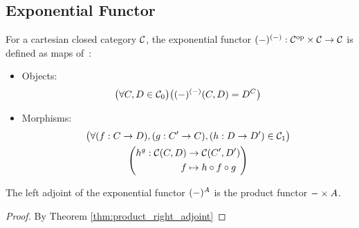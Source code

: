 \subsection{Exponential Functor}
\begin{definition}
  For a cartesian closed category $\mathcal{C}$, the exponential functor
  $({\--})^{({\--})}:\mathcal{C}^{\mathrm{op}}\times \mathcal{C} \to \mathcal{C}$ is defined as
  maps of~\parencite[p.~44]{lane:working_mathematician}:

  \begin{itemize}
    \item Objects:
      \[\big(\forall C, D \in \mathcal{C}_0\big)
        \big(({\--})^{({\--})}(C, D) = D^C\big)\]
    \item Morphisms:
      \[
        \begin{gathered}
          \big(\forall (f: C\to D),(g: C' \to C), (h: D\to D') \in \mathcal{C}_1\big)\\
          \left(
            \begin{aligned}
              h^g : \mathcal{C}(C, D) &\to \mathcal{C}(C', D')\\
              f&\mapsto h\circ f\circ g
            \end{aligned}
          \right)
        \end{gathered}
      \]
  \end{itemize}
\end{definition}

\begin{theorem}
  The left adjoint of the exponential functor $({\--})^A$ is the product functor
  ${\--}\times A$.

  \begin{proof}
    By Theorem \ref{thm:product_right_adjoint}
  \end{proof}
\end{theorem}

